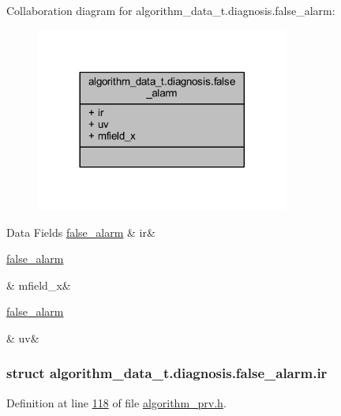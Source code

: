 Collaboration diagram for algorithm\+\_\+data\+\_\+t.\+diagnosis.\+false\+\_\+alarm\+:\nopagebreak
\begin{figure}[H]
\begin{center}
\leavevmode
\includegraphics[width=236pt]{d2/d79/a00898}
\end{center}
\end{figure}
\begin{DoxyFields}{Data Fields}
\hypertarget{a00016_ad74eea4899a61f9fcbc527ef988ea0ff}{\hyperlink{a00016_d0/d61/a00100}{false\+\_\+alarm}}\label{a00016_ad74eea4899a61f9fcbc527ef988ea0ff}
&
ir&
\\
\hline

\hypertarget{a00016_a46709d870ad5c3126599a53675c43291}{\hyperlink{a00016_d4/d3a/a00101}{false\+\_\+alarm}}\label{a00016_a46709d870ad5c3126599a53675c43291}
&
mfield\+\_\+x&
\\
\hline

\hypertarget{a00016_a45210da832f9626829457a65e9e7c4d0}{\hyperlink{a00016_d9/dcc/a00102}{false\+\_\+alarm}}\label{a00016_a45210da832f9626829457a65e9e7c4d0}
&
uv&
\\
\hline

\end{DoxyFields}
\label{d0/d61/a00100}
\hypertarget{a00016_d0/d61/a00100}{}
\subsubsection{struct algorithm\+\_\+data\+\_\+t.\+diagnosis.\+false\+\_\+alarm.\+ir}


Definition at line \hyperlink{a00016_source_l00118}{118} of file \hyperlink{a00016_source}{algorithm\+\_\+prv.\+h}.



